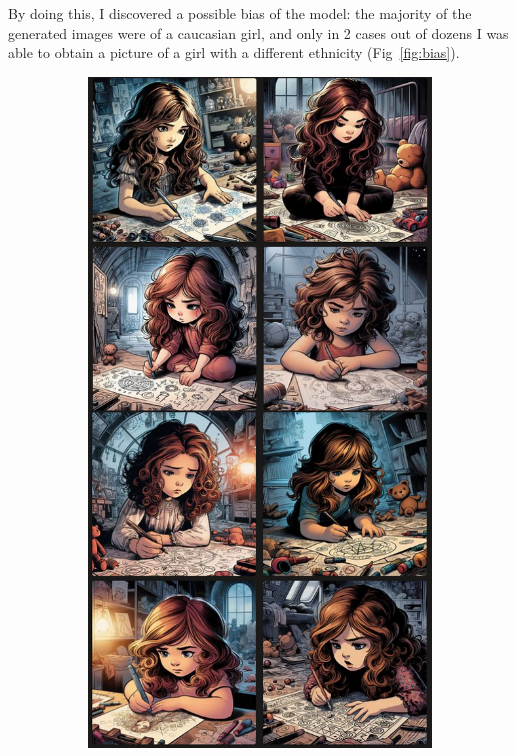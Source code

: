 \documentclass[a4paper,11pt]{article}
\begin{document}
By doing this, I discovered a possible bias of the model: the majority of the generated images were of a caucasian girl, and only in 2 cases out of dozens I was able to obtain a picture of a girl with a different ethnicity (Fig~\vref{fig:bias}).\medskip

\begin{figure}
    \centering
    \begin{subfigure}{0.4934\textwidth}
        \includegraphics[width=\textwidth]{figures/caucasian.png}

\end{subfigure}
\end{figure}
\end{document}
